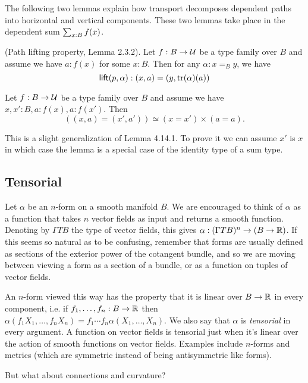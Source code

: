 \documentclass[12pt]{article}
\begin{document}
The following two lemmas explain how transport decomposes dependent paths into horizontal and vertical components. These two lemmas take place in the dependent sum \( \sum_{x:B}f(x) \).

\begin{mylemma}
  (Path lifting property, \cite{hottbook} Lemma 2.3.2). Let \(f:B\to\mathcal{U} \) be a type family over \( B \) and assume we have \( a:f(x) \) for some \( x:B \). Then for any \( \alpha:x=_B y \), we have 
  \[ 
  \mathsf{lift}(p, \alpha):(x,a)=(y,\mathrm{tr}(\alpha)(a))
  \]
\end{mylemma}

\begin{mylemma}
Let \(f:B\to\mathcal{U} \) be a type family over \( B \) and assume we have \( x,x':B,a:f(x),a:f(x') \). Then 
\[ 
((x,a)=(x',a'))\simeq (x=x')\times (a=a).
\]
\end{mylemma}

This is a slight generalization of \cite{Symmetry} Lemma 4.14.1. To prove it we can assume \( x' \) is \( x \) in which case the lemma is a special case of the identity type of a sum type.

\subsection{Tensorial}

Let \( \alpha \) be an \( n \)-form on a smooth manifold \( B \). We are encouraged to think of \( \alpha \) as a function that takes \( n \) vector fields as input and returns a smooth function. Denoting by \( \Gamma TB \) the type of vector fields, this gives \( \alpha:(\Gamma TB)^n\to (B\to \mathbb{R}) \). If this seems so natural as to be confusing, remember that forms are usually defined as sections of the exterior power of the cotangent bundle, and so we are moving between viewing a form as a section of a bundle, or as a function on tuples of vector fields.

An \( n \)-form viewed this way has the property that it is linear over \( B\to\mathbb{R} \) in every component, i.e. if \( f_1, \ldots, f_n:B\to\mathbb{R} \) then \( \alpha(f_1 X_1,\ldots, f_n X_n) = f_1\cdots f_n\alpha(X_1,\ldots,X_n). \) We also say that \( \alpha \) is \emph{tensorial} in every argument. A function on vector fields is tensorial just when it's linear over the action of smooth functions on vector fields. Examples include \( n \)-forms and metrics (which are symmetric instead of being antisymmetric like forms). 

But what about connections and curvature?
\end{document}

